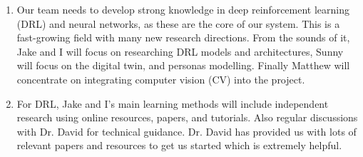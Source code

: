 \documentclass{article}
\begin{document}
\begin{enumerate}
    \item Our team needs to develop strong knowledge in deep reinforcement learning (DRL)
     and neural networks, as these are the core of our system. This is a fast-growing field
      with many new research directions. From the sounds of it, Jake and I will focus on researching DRL models 
      and architectures, Sunny will focus on the digital twin,
      and personas modelling. Finally Matthew will concentrate on integrating computer vision (CV) into the project.

    \item For DRL, Jake and I's main learning methods will include independent
     research using online resources, papers, and tutorials. Also regular discussions
      with Dr. David for technical guidance. Dr. David has provided us with lots of relevant papers
      and resources to get us started which is extremely helpful. 
\end{enumerate}
\end{document}
